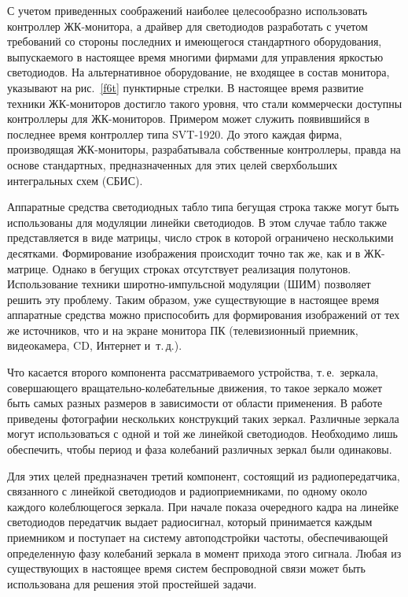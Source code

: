 \begin{multicols}{2}
  С учетом приведенных соображений наиболее целесообразно использовать контроллер 
ЖК-мо\-ни\-то\-ра, а драйвер для светодиодов разработать с учетом требований со стороны 
последних и име\-юще\-го\-ся стандартного оборудования, выпускаемого в настоящее время 
многими фирмами для управ\-ле\-ния яркостью светодиодов. На альтернативное 
оборудование, не входящее в состав монитора, указывают на рис.~\ref{f6t} пунктирные 
стрелки. В настоящее время развитие техники ЖК-мониторов достигло такого уровня, что 
стали коммерчески доступны контроллеры для ЖК-мониторов. Примером может служить 
появившийся в последнее время контроллер типа SVT-1920. До этого каждая фирма, 
производящая ЖК-мониторы, разрабатывала собственные контроллеры, правда на основе 
стандартных, предназначенных для этих целей сверхбольших интегральных схем (СБИС). 
  
  Аппаратные средства светодиодных табло типа бегущая строка также могут быть 
использованы для модуляции линейки светодиодов. В этом случае табло также 
представляется в виде матрицы, число строк в которой ограничено несколькими 
десятками. Формирование изображения происходит точно так же, как и в ЖК-матрице. 
Однако в бегущих строках отсутствует реализация полутонов. Использование техники 
широтно-импульсной модуляции (ШИМ) позволяет решить эту проблему. Таким образом, уже существующие в настоящее 
время аппаратные средства можно приспособить для формирования изображений от тех 
же источников, что и на экране монитора ПК (телевизионный приемник, видеокамера, CD, 
Интернет и~т.\,д.). 
  
  Что касается второго компонента рассматриваемого устройства, т.\,е.\ зеркала, 
совершающего вращательно-колебательные движения, то такое зеркало может быть 
самых разных размеров в зависимости от области применения. В работе~\cite{2t} 
приведены фотографии нескольких конструкций таких зеркал. Различные зеркала могут 
использоваться с одной и той же линейкой светодиодов. Необходимо лишь обеспечить, 
чтобы период и фаза колебаний различных зеркал были одинаковы. 
  
  Для этих целей предназначен третий компонент, состоящий из радиопередатчика, 
связанного с линейкой светодиодов и радиоприемниками, по одному около каждого 
колеблющегося зеркала. При начале показа очередного кадра на линейке светодиодов 
передатчик выдает радиосигнал, который принимается каждым приемником и поступает 
на систему автоподстройки частоты, обеспечивающей определенную фазу колебаний 
зеркала в момент прихода этого сигнала. Любая из существующих в настоящее время 
систем беспроводной связи может быть использована для решения этой простейшей 
задачи. 
  

\end{multicols}
